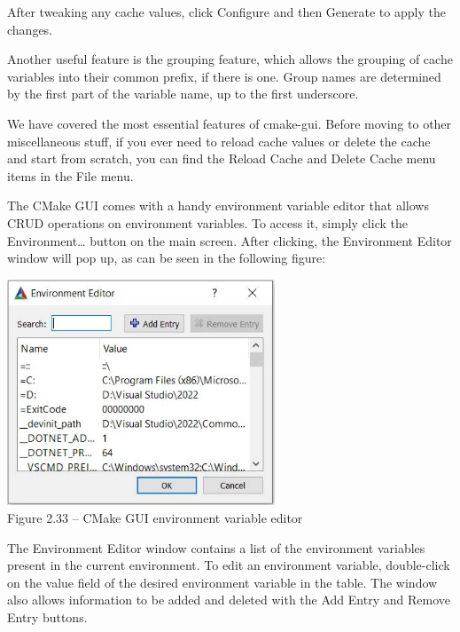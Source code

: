 After tweaking any cache values, click Configure and then Generate to apply the changes.

\begin{tcolorbox}[colback=webgreen!5!white,colframe=webgreen!75!black,title=Tip]
Another useful feature is the grouping feature, which allows the grouping of cache variables into their common prefix, if there is one. Group names are determined by the first part of the variable name, up to the first underscore.
\end{tcolorbox}

We have covered the most essential features of cmake-gui. Before moving to other miscellaneous stuff, if you ever need to reload cache values or delete the cache and start from scratch, you can find the Reload Cache and Delete Cache menu items in the File menu.


The CMake GUI comes with a handy environment variable editor that allows CRUD operations on environment variables. To access it, simply click the Environment… button on the main screen. After clicking, the Environment Editor window will pop up, as can be seen in the following figure:

\begin{center}
\includegraphics[width=0.6\textwidth]{content/1/chapter2/images/33.jpg}\\
Figure 2.33 – CMake GUI environment variable editor
\end{center}

The Environment Editor window contains a list of the environment variables present in the current environment. To edit an environment variable, double-click on the value field of the desired environment variable in the table. The window also allows information to be added and deleted with the Add Entry and Remove Entry buttons.

